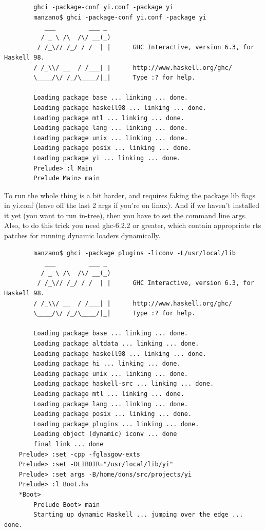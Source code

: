 \documentclass[]{article}
\begin{document}
{\small
\begin{verbatim}
        ghci -package-conf yi.conf -package yi
        manzano$ ghci -package-conf yi.conf -package yi
           ___         ___ _
          / _ \ /\  /\/ __(_)
         / /_\// /_/ / /  | |      GHC Interactive, version 6.3, for Haskell 98.
        / /_\\/ __  / /___| |      http://www.haskell.org/ghc/
        \____/\/ /_/\____/|_|      Type :? for help.

        Loading package base ... linking ... done.
        Loading package haskell98 ... linking ... done.
        Loading package mtl ... linking ... done.
        Loading package lang ... linking ... done.
        Loading package unix ... linking ... done.
        Loading package posix ... linking ... done.
        Loading package yi ... linking ... done.
        Prelude> :l Main
        Prelude Main> main
\end{verbatim}
}

To run the whole thing is a bit harder, and requires faking the package
lib flags in yi.conf (leave off the last 2 args if you're on linux). And
if we haven't installed it yet (you want to run in-tree), then you have
to set the command line args. Also, to do this trick you need ghc-6.2.2
or greater, which contain appropriate rts patches for running dynamic
loaders dynamically.

{\small
\begin{verbatim}
        manzano$ ghci -package plugins -liconv -L/usr/local/lib
           ___         ___ _
          / _ \ /\  /\/ __(_)
         / /_\// /_/ / /  | |      GHC Interactive, version 6.3, for Haskell 98.
        / /_\\/ __  / /___| |      http://www.haskell.org/ghc/
        \____/\/ /_/\____/|_|      Type :? for help.

        Loading package base ... linking ... done.
        Loading package altdata ... linking ... done.
        Loading package haskell98 ... linking ... done.
        Loading package hi ... linking ... done.
        Loading package unix ... linking ... done.
        Loading package haskell-src ... linking ... done.
        Loading package mtl ... linking ... done.
        Loading package lang ... linking ... done.
        Loading package posix ... linking ... done.
        Loading package plugins ... linking ... done.
        Loading object (dynamic) iconv ... done
        final link ... done
    Prelude> :set -cpp -fglasgow-exts
    Prelude> :set -DLIBDIR="/usr/local/lib/yi"
    Prelude> :set args -B/home/dons/src/projects/yi
    Prelude> :l Boot.hs
    *Boot>
        Prelude Boot> main
        Starting up dynamic Haskell ... jumping over the edge ... done.
\end{verbatim}
}
\end{document}
